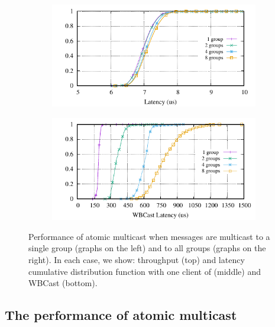\begin{figure}[ht]
  \begin{subfigure}{\columnwidth}
    \centering
    \includegraphics[width=0.95\columnwidth]{figures/benchmark/graphs/figure-genuine-compare-latency-cdf}
  \end{subfigure}
  \begin{subfigure}{\columnwidth}
    \centering
    \includegraphics[width=0.95\columnwidth]{figures/benchmark/graphs/figure-multi-dest-compare-latency-cdf-WBCast}
  \end{subfigure}
  \caption{Performance of atomic multicast when messages are multicast to a single group (graphs on the left) and to all groups (graphs on the right). In each case, we show: throughput (top) and latency cumulative distribution function with one client of \libname (middle) and WBCast (bottom).}
  \label{fig:1group_message_size}
\end{figure}

\subsection{The performance of atomic multicast}
\label{sec:evaluation:multicast}


